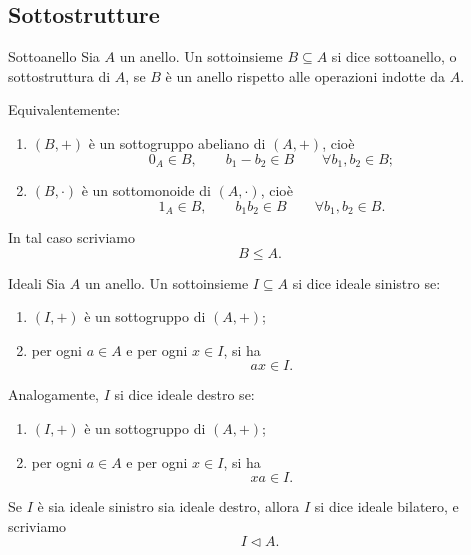 \documentclass[a4paper]{article}
\begin{document}
\subsection{Sottostrutture}

\begin{radioactive}
\begin{snippetdefinition}{Sottoanello}
    Sia \(A\) un anello. Un sottoinsieme \(B \subseteq A\) si dice sottoanello, o sottostruttura di \(A\), se \(B\) è un anello rispetto alle operazioni indotte da \(A\).

    Equivalentemente:
    \begin{enumerate}
        \item \((B,+)\) è un sottogruppo abeliano di \((A,+)\), cioè
        \[
            0_A \in B,
            \qquad
            b_1-b_2 \in B
            \qquad
            \forall b_1,b_2 \in B;
        \]

        \item \((B,\cdot)\) è un sottomonoide di \((A,\cdot)\), cioè
        \[
            1_A \in B,
            \qquad
            b_1b_2 \in B
            \qquad
            \forall b_1,b_2 \in B.
        \]
    \end{enumerate}

    In tal caso scriviamo
    \[
        B \leq A.
    \]
\end{snippetdefinition}
\end{radioactive}

\begin{radioactive}
\begin{snippetdefinition}{Ideali}
    Sia \(A\) un anello. Un sottoinsieme \(I \subseteq A\) si dice ideale sinistro se:
    \begin{enumerate}
        \item \((I,+)\) è un sottogruppo di \((A,+)\);
        \item per ogni \(a \in A\) e per ogni \(x \in I\), si ha
        \[
            ax \in I.
        \]
    \end{enumerate}

    Analogamente, \(I\) si dice ideale destro se:
    \begin{enumerate}
        \item \((I,+)\) è un sottogruppo di \((A,+)\);
        \item per ogni \(a \in A\) e per ogni \(x \in I\), si ha
        \[
            xa \in I.
        \]
    \end{enumerate}

    Se \(I\) è sia ideale sinistro sia ideale destro, allora \(I\) si dice ideale bilatero, e scriviamo
    \[
        I \triangleleft A.
    \]
\end{snippetdefinition}
\end{radioactive}
\end{document}
